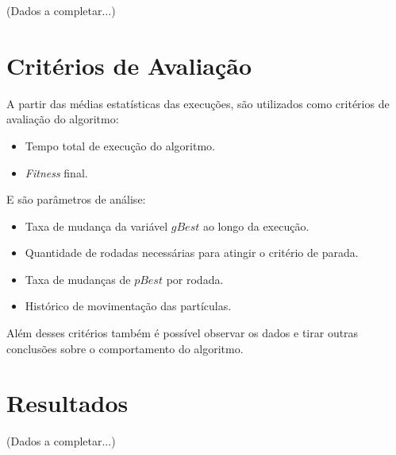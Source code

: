 (Dados a completar...)
% 
\section{Critérios de Avaliação}
A partir das médias estatísticas das execuções, são utilizados como critérios de avaliação do algoritmo: \hfill
\begin{itemize}
\item Tempo total de execução do algoritmo.
\item \textit{Fitness} final.
\end{itemize}

\noindent E são parâmetros de análise:\hfill
\begin{itemize}
\item Taxa de mudança da variável $gBest$ ao longo da execução.
\item Quantidade de rodadas necessárias para atingir o critério de parada.
\item Taxa de mudanças de $pBest$ por rodada.
\item Histórico de movimentação das partículas.
\end{itemize}

Além desses critérios também é possível observar os dados e tirar outras conclusões sobre o comportamento do algoritmo.\hfill

%


\section{Resultados}
(Dados a completar...)
%
